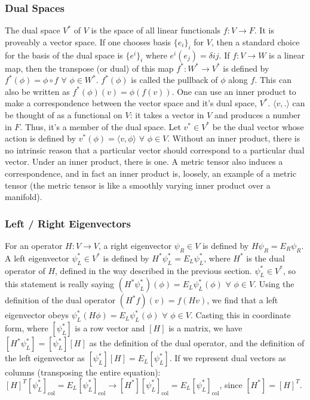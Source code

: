 \documentclass[11pt]{article}
\begin{document}
	\subsubsection*{Dual Spaces}
	The dual space $V^*$ of $V$ is the space of all linear functionals $f: V\rightarrow F$. It is proveably a vector space. If one chooses basis $\{e_i\}_i$ for $V$, then a standard choice for the basis of the dual space is $\{e^i\}_i$ where $e^i(e_j) = \delta{ij}$. If $f: V\rightarrow W$ is a linear map, then the transpose (or dual) of this map $f^*: W^*\rightarrow V^*$ is defined by $f^*(\phi) = \phi\circ f$ $\forall$ $\phi\in W^*$. $f^*(\phi)$ is called the pullback of $\phi$ along $f$. This can also be written as $f^*(\phi)(v)=\phi (f(v))$. One can use an inner product to make a correspondence between the vector space and it's dual space, $V^*$. $\langle v, .\rangle$ can be thought of as a functional on $V$: it takes a vector in $V$ and produces a number in $F$. Thus, it's a member of the dual space. Let $v^*\in V^*$ be the dual vector whose action is defined by $v^*(\phi)=\langle v, \phi\rangle$ $\forall$ $\phi\in V$. Without an inner product, there is no intrinsic reason that a particular vector should correspond to a particular dual vector. Under an inner product, there is one. A metric tensor also induces a correspondence, and in fact an inner product is, loosely, an example of a metric tensor (the metric tensor is like a smoothly varying inner product over a manifold).
	
	\subsubsection*{Left / Right Eigenvectors}
	For an operator $H:V\to V$, a right eigenvector $\psi_R\in V$ is defined by $H\psi_R= E_R\psi_R$. A left eigenvector $\psi^*_L\in V^*$ is defined by $H^*\psi^*_L = E_L \psi^*_L$, where $H^*$ is the dual operator of $H$, defined in the way described in the previous section. $\psi^*_L\in V^*$, so this statement is really saying $(H^*\psi^*_L)(\phi)=E_L\psi^*_L(\phi)$ $\forall$ $\phi\in V$. Using the definition of the dual operator $(H^*f)(v)=f(Hv)$, we find that a left eigenvector obeys $\psi^*_L(H\phi) = E_L\psi^*_L(\phi)$ $\forall$ $\phi \in V$. Casting this in coordinate form, where $[\psi^*_L]$ is a row vector and $[H]$ is a matrix, we have $[H^*\psi^*_L] = [\psi^*_L][H]$ as the definition of the dual operator, and the definition of the left eigenvector as $[\psi^*_L][H]=E_L[\psi^*_L].$ If we represent dual vectors as columns (transposing the entire equation): $[H]^T[\psi^*_L]_\text{col} = E_L[\psi^*_L]_\text{col}\rightarrow[H^*][\psi^*_L]_\text{col} = E_L[\psi^*_L]_\text{col}$, since $[H^*]=[H]^T$.
	
\end{document}

